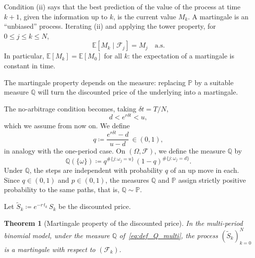 \documentclass[11pt,a4paper,oneside]{report}
\theoremstyle{plain}
\newtheorem{teorema}{Theorem}[chapter]
\theoremstyle{definition}
\theoremstyle{remark}
\newcommand{\E}{\mathbb{E}}
\newcommand{\PP}{\mathbb{P}}
\newcommand{\Q}{\mathbb{Q}}
\newcommand{\F}{\mathcal{F}}
\newcommand{\1}{\mathbf{1}}
\newcommand{\eqdef}{\coloneqq}
\begin{document}
Condition (ii) says that the best prediction of the
value of the process at time $k+1$, given the information up to $k$,
is the current value $M_k$. A martingale is an ``unbiased'' process.
Iterating (ii) and applying the tower property, for
$0 \leq j \leq k \leq N$,
\begin{equation}\label{eq:martingala_iterada}
  \E[M_k \mid \F_j] = M_j \quad \text{a.s.}
\end{equation}
In particular, $\E[M_k] = \E[M_0]$ for all $k$: the expectation of a
martingale is constant in time.

\medskip

The martingale property depends on the measure: replacing $\PP$ by a
suitable measure $\Q$ will turn the discounted price of the underlying
into a martingale.

The no-arbitrage condition becomes, taking $\delta t = T/N$,
\begin{equation}\label{eq:cond_noarb_multi}
  d < e^{r \delta t} < u,
\end{equation}
which we assume from now on. We define
\begin{equation}\label{eq:def_q_multi}
  q \eqdef \frac{e^{r \delta t} - d}{u - d}\, \in (0, 1),
\end{equation}
in analogy with the one-period case. On $(\Omega, \F)$, we define the
measure $\Q$ by
\begin{equation}\label{eq:def_Q_multi}
  \Q(\{\omega\}) \eqdef q^{\#\{j: \omega_j = u\}}\,
                       (1-q)^{\#\{j: \omega_j = d\}}.
\end{equation}
Under $\Q$, the steps are independent with probability $q$ of an up
move in each. Since $q \in (0, 1)$ and $p \in (0, 1)$, the measures
$\Q$ and $\PP$ assign strictly positive probability to the same paths,
that is, $\Q \sim \PP$.

Let
$\widetilde S_k \eqdef e^{-r\, t_k}\, S_k$ be the discounted price.

\begin{teorema}[Martingale property of the discounted price]
\label{teo:martingala_precio_descontado}
In the multi-period binomial model, under the measure $\Q$
of~\eqref{eq:def_Q_multi}, the process $(\widetilde S_k)_{k=0}^{N}$ is
a martingale with respect to $(\F_k)$.
\end{teorema}
\end{document}
